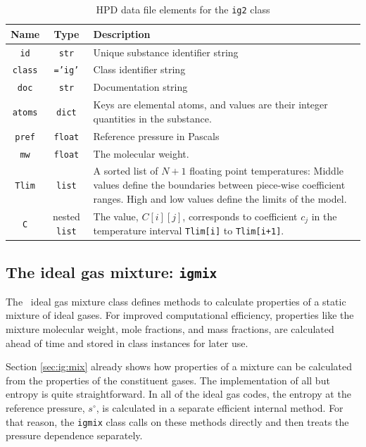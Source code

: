 \begin{table}
\centering
\caption{HPD data file elements for the \texttt{ig2} class}\label{tab:class:ig2}
\begin{tabular}{|ccp{2.5in}|}
\hline
Name & Type & Description\\
\hline
\texttt{id} & \texttt{str} & Unique substance identifier string\\
\texttt{class} & \texttt{='ig'} & Class identifier string\\
\texttt{doc} & \texttt{str} & Documentation string\\
\hline
\texttt{atoms} & \texttt{dict} & Keys are elemental atoms, and values are their integer quantities in the substance.\\
\texttt{pref} & \texttt{float} & Reference pressure in Pascals\\
\texttt{mw} & \texttt{float} & The molecular weight.\\
\texttt{Tlim} & \texttt{list} & A sorted list of $N+1$ floating point temperatures: Middle values define the boundaries between piece-wise coefficient ranges.  High and low values define the limits of the model.\\
\texttt{C} & nested \texttt{list} & The value, $C[i][j]$, corresponds to coefficient $c_j$ in the temperature interval \texttt{Tlim[i]} to \texttt{Tlim[i+1]}.\\
\hline
\end{tabular}
\end{table}

\subsection{The ideal gas mixture: \texttt{igmix}}

The \PM\ ideal gas mixture class defines methods to calculate properties of a static mixture of ideal gases.  For improved computational efficiency, properties like the mixture molecular weight, mole fractions, and mass fractions, are calculated ahead of time and stored in class instances for later use.

Section \ref{sec:ig:mix} already shows how properties of a mixture can be calculated from the properties of the constituent gases.  The implementation of all but entropy is quite straightforward.  In all of the ideal gas codes, the entropy at the reference pressure, $s^\circ$, is calculated in a separate efficient internal method.  For that reason, the \texttt{igmix} class calls on these methods directly and then treats the pressure dependence separately.

